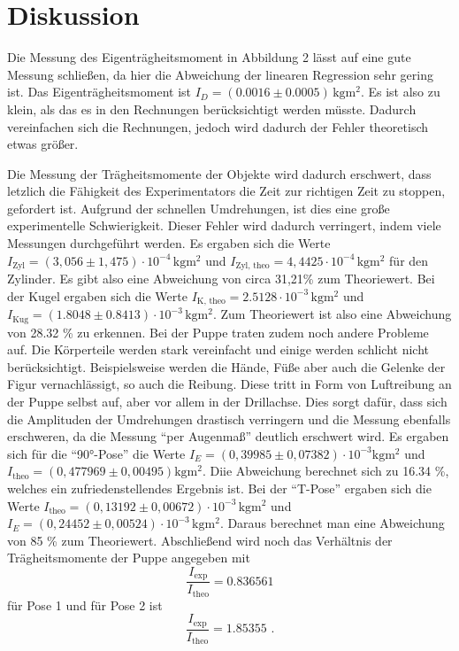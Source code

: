 \section{Diskussion}
\label{sec:Diskussion}

Die Messung des Eigenträgheitsmoment in Abbildung 2 lässt auf eine gute Messung schließen,
da hier die Abweichung der linearen Regression sehr gering ist.
Das Eigenträgheitsmoment ist $I_{D} =  (0.0016 \pm 0.0005) \, \unit{\kilo\gram\meter\squared}$.
Es ist also zu klein, als das es in den Rechnungen berücksichtigt werden müsste.
Dadurch vereinfachen sich die Rechnungen, jedoch wird dadurch der Fehler theoretisch etwas größer.

Die Messung der Trägheitsmomente der Objekte wird dadurch erschwert, dass letzlich die Fähigkeit des Experimentators die Zeit zur 
richtigen Zeit zu stoppen, gefordert ist.
Aufgrund der schnellen Umdrehungen, ist dies eine große experimentelle Schwierigkeit.
Dieser Fehler wird dadurch verringert, indem viele Messungen durchgeführt werden.
Es ergaben sich die Werte $I_{\text{Zyl}} = (3,056 \pm 1,475) \cdot 10^{-4} \, \unit{\kilo\gram\meter\squared}$
und $I_{\text{Zyl, theo}} = 4,4425 \cdot 10^{-4} \, \unit{\kilo\gram\meter\squared}$ für den Zylinder. Es gibt also eine Abweichung
von circa 31,21\% zum Theoriewert.
Bei der Kugel ergaben sich die Werte $ I_{\text{K, theo}} = 2.5128 \cdot 10^{-3} \, \unit{\kilo\gram\meter\squared}$ und
$ I_{\text{Kug}} = (1.8048 \pm 0.8413) \cdot 10^{-3} \, \unit{\kilo\gram\meter\squared}$. Zum Theoriewert ist also eine Abweichung von
28.32 \% zu erkennen.
Bei der Puppe traten zudem noch andere Probleme auf.
Die Körperteile werden stark vereinfacht und einige werden schlicht nicht berücksichtigt.
Beispielsweise werden die Hände, Füße aber auch die Gelenke der Figur vernachlässigt, so auch die Reibung.
Diese tritt in Form von Luftreibung an der Puppe selbst auf, aber vor allem in der Drillachse.
Dies sorgt dafür, dass sich die Amplituden der Umdrehungen drastisch verringern und die Messung ebenfalls erschweren, da die
Messung \enquote{per Augenmaß} deutlich erschwert wird.
Es ergaben sich für die \enquote{90°-Pose} die Werte $I_E =( 0,39985 \pm 0,07382) \cdot 10^{-3}  \unit{\kilo\gram\meter\squared}$ und
$I_{\text{theo}} = (0,477969 \pm 0,00495)  \unit{\kilo\gram\meter\squared}$. Diie Abweichung berechnet sich zu 16.34 \%,
welches ein zufriedenstellendes Ergebnis ist.
Bei der \enquote{T-Pose} ergaben sich die Werte $I_{\text{theo}} = (0,13192 \pm 0,00672) \cdot 10^{-3} \, \unit{\kilo\gram\meter\squared}$
und  $I_E = (0,24452 \pm 0,00524)  \cdot 10^{-3} \, \unit{\kilo\gram\meter\squared}$.
Daraus berechnet man eine Abweichung von 85 \% zum Theoriewert.
Abschließend wird noch das Verhältnis der Trägheitsmomente der Puppe angegeben mit
\begin{equation}
    \frac{I_\text{exp}}{I_\text{theo}} = 0.836561
\end{equation}
für Pose 1 und für Pose 2 ist
\begin{equation}
    \frac{I_\text{exp}}{I_\text{theo}} = 1.85355 \text{ .}
\end{equation}
\nocite{matplotlib}
\nocite{numpy}